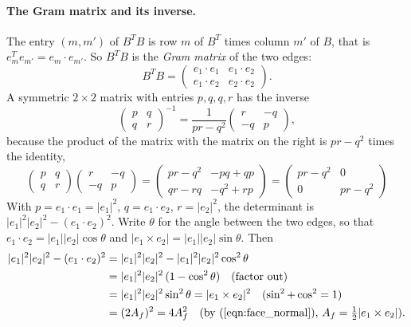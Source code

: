 \paragraph{The Gram matrix and its inverse.} The entry $(m, m')$ of $B^TB$ is row $m$ of $B^T$ times column $m'$ of $B$, that is $e_m^T e_{m'} = e_m \cdot e_{m'}$. So $B^T B$ is the \emph{Gram matrix} of the two edges:
\begin{equation*}
B^T B = \begin{pmatrix} e_1\cdot e_1 & e_1\cdot e_2 \\ e_1\cdot e_2 & e_2\cdot e_2\end{pmatrix} .
\end{equation*}
A symmetric $2\times 2$ matrix with entries $p, q, q, r$ has the inverse
\begin{equation*}
\begin{pmatrix} p & q \\ q & r\end{pmatrix}^{-1} = \frac{1}{pr - q^2}\begin{pmatrix} r & -q \\ -q & p\end{pmatrix},
\end{equation*}
because the product of the matrix with the matrix on the right is $pr - q^2$ times the identity,
\begin{equation*}
\begin{pmatrix} p & q \\ q & r\end{pmatrix}\begin{pmatrix} r & -q \\ -q & p\end{pmatrix} = \begin{pmatrix} pr - q^2 & -pq + qp \\ qr - rq & -q^2 + rp\end{pmatrix} = \begin{pmatrix} pr - q^2 & 0 \\ 0 & pr - q^2\end{pmatrix}
\end{equation*}
With $p = e_1\cdot e_1 = |e_1|^2$, $q = e_1\cdot e_2$, $r = |e_2|^2$, the determinant is $|e_1|^2|e_2|^2 - (e_1\cdot e_2)^2$. Write $\theta$ for the angle between the two edges, so that $e_1\cdot e_2 = |e_1||e_2|\cos\theta$ and $|e_1\times e_2| = |e_1||e_2|\sin\theta$. Then
\begin{align*}
|e_1|^2|e_2|^2 - (e_1\cdot e_2)^2 &= |e_1|^2|e_2|^2 - |e_1|^2|e_2|^2\cos^2\theta \\
&= |e_1|^2|e_2|^2\,(1 - \cos^2\theta) \quad \text{(factor out)}\\
&= |e_1|^2|e_2|^2\sin^2\theta = |e_1\times e_2|^2 \quad (\sin^2 + \cos^2 = 1) \\
&= (2A_f)^2 = 4A_f^2 \quad \text{(by~(\ref{eqn:face_normal}), } A_f = \tfrac12|e_1\times e_2|\text{)} .
\end{align*}
